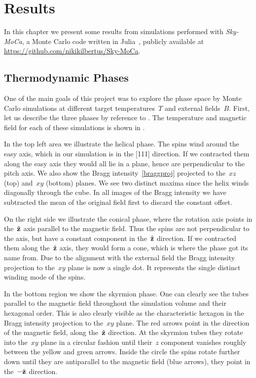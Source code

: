 %
\chapter{Results}\label{chap:2}
%
In this chapter we present some results from simulations performed with
\emph{Sky-MoCa}, a Monte Carlo code written in Julia~\cite{julia}, publicly
available at
\href{https://github.com/nikikilbertus/Sky-MoCa}{\textsf{https://github.com/nikikilbertus/Sky-MoCa}}.
%
\section{Thermodynamic Phases}\label{sec:phases}
%
One of the main goals of this project was to explore the phase space by 
Monte Carlo simulations at different target temperatures~$T$ and external
fields~$B$. First, let us describe the three phases by reference to
. The temperature and magnetic field for each of these
simulations is shown in .

In the top left area we illustrate the helical phase. The spins wind around the
easy axis, which in our simulation is in the [111] direction. If we contracted
them along the easy axis they would all lie in a plane, hence are perpendicular
to the pitch axis. We also show the Bragg intensity~\eqref{braggproj} projected
to the~$xz$ (top) and~$xy$ (bottom) planes. We see two distinct maxima since the
helix winds diagonally through the cube. In all images of the Bragg intensity we
have subtracted the mean of the original field first to discard the constant
offset.

On the right side we illustrate the conical phase, where the rotation axis
points in the~$\hat{\mathbf{z}}$ axis parallel to the magnetic field. Thus the spins are not
perpendicular to the axis, but have a constant component in the~$\hat{\mathbf{z}}$ direction.
If we contracted them along the~$\hat{\mathbf{z}}$ axis, they would form a cone, which is
where the phase got its name from. Due to the alignment with the external field
the Bragg intensity projection to the~$xy$ plane is now a single dot. It
represents the single distinct winding mode of the spins.

In the bottom region we show the skyrmion phase. One can clearly see the tubes
parallel to the magnetic field throughout the simulation volume and their
hexagonal order. This is also clearly visible as the characteristic hexagon in
the Bragg intensity projection to the~$xy$ plane. The red arrows point in the
direction of the magnetic field, \ie{} along the~$\hat{\mathbf{z}}$ direction. At the
skyrmion tubes they rotate into the~$xy$ plane in a circular fashion until
their~$z$ component vanishes roughly between the yellow and green arrows. Inside
the circle the spins rotate further down until they are antiparallel to the
magnetic field (blue arrows), \ie{} they point in the~$-\hat{\mathbf{z}}$ direction.

